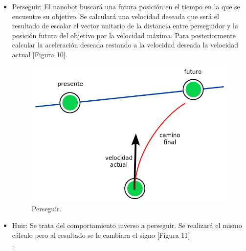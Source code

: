 \begin{itemize}
\item Perseguir: El nanobot buscará una futura posición en el tiempo en la que se encuentre su objetivo. Se calculará una velocidad deseada que será el resultado de escalar el vector unitario de la distancia entre perseguidor y la posición futura del objetivo por la velocidad máxima. Para posteriormente calcular la aceleración deseada restando a la velocidad deseada la velocidad actual [Figura 10].

 \begin{figure}[H]
 \centering
 \includegraphics[scale=0.4]{../images/pursuit.png}
 \caption{Perseguir.}
 \label{fig:../images/pursuit.png}
 \end{figure}

 \item Huir: Se trata del comportamiento inverso a perseguir. Se realizará el mismo cálculo pero al resultado se le cambiara el signo [Figura 11]\\. 



\end{itemize}
